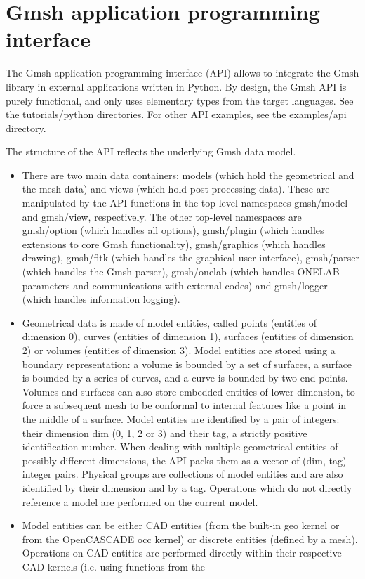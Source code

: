 \documentclass[dvipdfmx, 9pt, a4paper]{article}
\numberwithin{equation}{section}
\begin{document}
\section{Gmsh application programming interface}
The Gmsh application programming interface (API) allows to integrate the Gmsh library in external applications written in Python. By design, the Gmsh API is purely functional, and only uses elementary types from the target languages. See the tutorials/python directories. For other API examples, see the examples/api directory.\par
The structure of the API reflects the underlying Gmsh data model.
\begin{itemize}
\item There are two main data containers: models (which hold the geometrical and the mesh data) and views (which hold post-processing data). These are manipulated by the API functions in the top-level namespaces gmsh/model and gmsh/view, respectively. The other top-level namespaces are gmsh/option (which handles all options), gmsh/plugin (which handles extensions to core Gmsh functionality), gmsh/graphics (which handles drawing), gmsh/fltk (which handles the graphical user interface), gmsh/parser (which handles the Gmsh parser), gmsh/onelab (which handles ONELAB parameters and communications with external codes) and gmsh/logger (which handles information logging).
\item Geometrical data is made of model entities, called points (entities of dimension 0), curves (entities of dimension 1), surfaces (entities of dimension 2) or volumes (entities of dimension 3). Model entities are stored using a boundary representation: a volume is bounded by a set of surfaces, a surface is bounded by a series of curves, and a curve is bounded by two end points. Volumes and surfaces can also store embedded entities of lower dimension, to force a subsequent mesh to be conformal to internal features like a point in the middle of
a surface. Model entities are identified by a pair of integers: their dimension dim (0, 1, 2 or 3) and their tag, a strictly positive identification number. When dealing with multiple geometrical entities of possibly different dimensions, the API packs them as a vector of (dim, tag) integer pairs. Physical groups are collections of model entities and are also identified by their dimension and by a tag. Operations which do not directly reference a model are performed on the current model.
\item Model entities can be either CAD entities (from the built-in geo kernel or from the OpenCASCADE occ kernel) or discrete entities (defined by a mesh). Operations on CAD entities are performed directly within their respective CAD kernels (i.e. using functions from the

\end{itemize}
\end{document}
